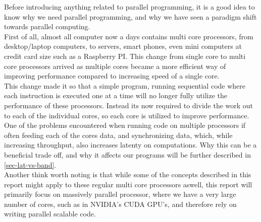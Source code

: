 Before introducing anything related to parallel programming, it is a good idea to know why we need parallel programming, and why we have seen a paradigm shift towards parallel computing.\\
First of all, almost all computer now a days contains multi core processors, from desktop/laptop computers, to servers, smart phones, even mini computers at credit card size such as a Raspberry PI. This change from single core to multi core processors arrived as multiple cores became a more efficient way of improving performance compared to increasing speed of a single core.\\
This change made it so that a simple program, running sequential code where each instruction is executed one at a time will no longer fully utilize the performance of these processors. Instead its now required to divide the work out to each of the individual cores, so each core is utilized to improve performance. One of the problems encountered when running code on multiple processors if often feeding each of the cores data, and synchronizing data, which, while increasing throughput, also increases latenty on computations. Why this can be a beneficial trade off, and why it affects our programs will be further described in \cref{sec-lat-vs-band}.\\
Another think worth noting is that while some of the concepts described in this report might apply to these regular multi core processors aswell, this report will primarily focus on massively parallel processor, where we have a very large number of cores, such as in NVIDIA's CUDA GPU's, and therefore rely on writing parallel scalable code.